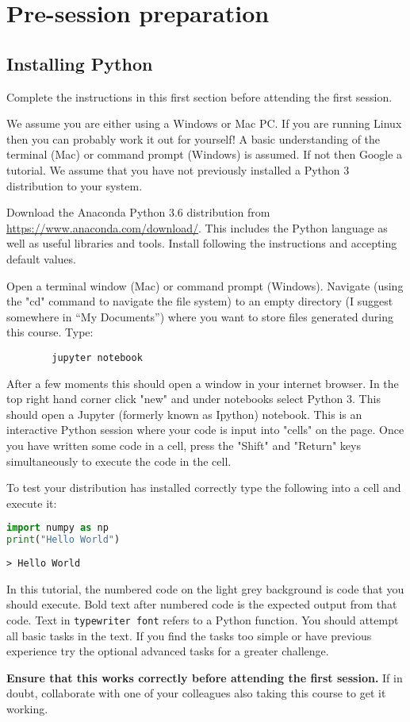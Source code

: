 \section{Pre-session preparation}
\subsection{Installing Python}
	Complete the instructions in this first section before attending the first session.
	
	We assume you are either using a Windows or Mac PC. If you are running Linux then you can probably work it out for yourself! A basic understanding of the terminal (Mac) or command prompt (Windows) is assumed. If not then Google a tutorial. We assume that you have not previously installed a Python 3 distribution to your system.
	
	Download the Anaconda Python 3.6 distribution from \url{https://www.anaconda.com/download/}. This includes the Python language as well as useful libraries and tools. Install following the instructions and accepting default values.

	Open a terminal window (Mac) or command prompt (Windows). Navigate (using the "cd" command to navigate the file system) to an empty directory (I suggest somewhere in ``My Documents'') where you want to store files generated during this course. Type:
	\begin{verbatim}
		jupyter notebook
	\end{verbatim}

After a few moments this should open a window in your internet browser. In the top right hand corner click "new" and under notebooks select Python 3. This should open a Jupyter (formerly known as Ipython) notebook. This is an interactive Python session where your code is input into "cells" on the page. Once you have written some code in a cell, press the "Shift" and "Return" keys simultaneously to execute the code in the cell.

To test your distribution has installed correctly type the following into a cell and execute it:

		\begin{lstlisting}[language=Python]
import numpy as np
print("Hello World")\end{lstlisting}
		\begin{verbatim}> Hello World\end{verbatim}
		
In this tutorial, the numbered code on the light grey background is code that you should execute. Bold text after numbered code is the expected output from that code. Text in \texttt{typewriter font} refers to a Python function. You should attempt all basic tasks in the text. If you find the tasks too simple or have previous experience try the optional advanced tasks for a greater challenge.

\textbf{Ensure that this works correctly before attending the first session.} If in doubt, collaborate with one of your colleagues also taking this course to get it working.